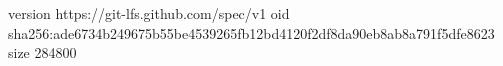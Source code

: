 version https://git-lfs.github.com/spec/v1
oid sha256:ade6734b249675b55be4539265fb12bd4120f2df8da90eb8ab8a791f5dfe8623
size 284800
